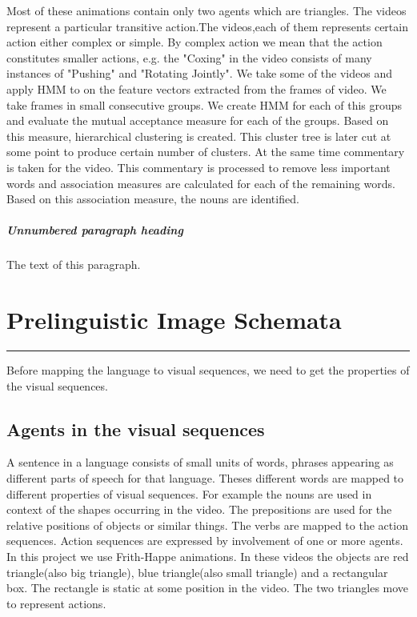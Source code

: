 \documentclass[a4paper, 10pt, notitlepage]{report}
\begin{document}
\hspace*{10pt} Most of these animations contain only two agents which are triangles. The videos represent a particular transitive action.The videos,each of them represents certain action either complex or simple. By complex action we mean that the action constitutes smaller actions, e.g. the "Coxing" in the video consists of many instances of "Pushing" and "Rotating Jointly". We take some of the videos and apply HMM to on the feature vectors extracted from the frames of video. We take frames in small consecutive groups. We create HMM for each of this groups and evaluate the mutual acceptance measure for each of the groups. Based on this measure, hierarchical clustering is created. This cluster tree is later cut at some point to produce certain number of clusters.
\hspace*{10pt} At the same time commentary is taken for the video. This commentary is processed to remove less important words and association measures are calculated for each of the remaining words. Based on this association measure, the nouns are identified.

\paragraph{Unnumbered paragraph heading}
The text of this paragraph.

\chapter{Prelinguistic Image Schemata}
\hrule height 2pt
\vspace*{10pt}
Before mapping the language to visual sequences, we need to get the properties of the visual sequences.\\
\section{Agents in the visual sequences}
A sentence in a language consists of small units of words, phrases appearing as different parts of speech for that language. Theses different words are mapped to different properties of visual sequences. For example the nouns are used in context of the shapes occurring in the video. The prepositions are used for the relative positions of objects or similar things. The verbs are mapped to the action sequences. Action sequences are expressed by involvement of one or more agents.\\
\hspace*{10pt} In this project we use Frith-Happe \cite{fhanimation} animations. In these videos the objects are red triangle(also big triangle), blue triangle(also small triangle) and a rectangular box. The rectangle is static at some position in the video. The two triangles move to represent actions.\\
\end{document}
